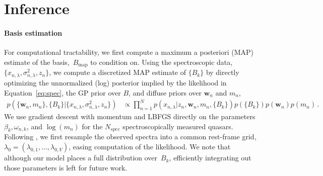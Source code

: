 \documentclass{article} %
\begin{document}
\section{Inference}
\label{sec:inference} 
\paragraph{Basis estimation}
For computational tractability, we first compute a maximum a posteriori (MAP) estimate of the basis,~$B_{\text{map}}$ to condition on.  
Using the spectroscopic data, $\{x_{n, \lambda}, \sigma_{n, \lambda}^2, z_n\}$, we compute a discretized MAP estimate of $\{B_k\}$ by directly optimizing the unnormalized (log) posterior implied by the likelihood in Equation~\ref{eq:spec}, the GP prior over $B$, and diffuse priors over $\mathbf{w}_n$ and $m_n$,
\begin{align}
	p\left(\{\mathbf{w}_n, m_n\}, \{ B_k \} | \{x_{n, \lambda}, \sigma_{n, \lambda}^2, z_n\} \right) 
	&\propto \prod_{n=1}^N p(x_{n, \lambda} | z_n, \mathbf{w}_n, m_n, \{B_k\}) p(\{B_k\}) p(\mathbf{w}_n) p(m_n) \, .
\end{align}
We use gradient descent with momentum and LBFGS \cite{nocedal1980updating} directly on the parameters $\beta_k, \omega_{n,k}$, and $\log(m_n)$ for the $N_{spec}$ spectroscopically measured quasars.  
Following \cite{walcher2011fitting}, we first resample the observed spectra into a common rest-frame grid, ${\lambda_0 = (\lambda_{0,1}, \dots, \lambda_{0,V})}$, easing computation of the likelihood.  
We note that although our model places a full distribution over~$B_k$, efficiently integrating out those parameters is left for future work.
\end{document}

